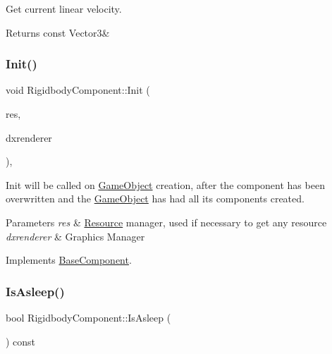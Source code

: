 Get current linear velocity. 

\begin{DoxyReturn}{Returns}
const Vector3\& 
\end{DoxyReturn}
\mbox{\label{classRigidbodyComponent_a3fe46e628d20481031089e0e3e6bc6ee}} 
\subsubsection{\texorpdfstring{Init()}{Init()}}
{\footnotesize\ttfamily void Rigidbody\+Component\+::\+Init (\begin{DoxyParamCaption}\item[{\hyperlink{classResourceManager}{Resource\+Manager} $\ast$}]{res,  }\item[{\hyperlink{classDXRenderer}{D\+X\+Renderer} $\ast$}]{dxrenderer }\end{DoxyParamCaption})\hspace{0.3cm}{\ttfamily [override]}, {\ttfamily [virtual]}}



Init will be called on \hyperlink{classGameObject}{Game\+Object} creation, after the component has been overwritten and the \hyperlink{classGameObject}{Game\+Object} has had all its components created. 


\begin{DoxyParams}{Parameters}
{\em res} & \hyperlink{structResource}{Resource} manager, used if necessary to get any resource \\
\hline
{\em dxrenderer} & Graphic\textquotesingle{}s Manager \\
\hline
\end{DoxyParams}


Implements \hyperlink{classBaseComponent}{Base\+Component}.

\mbox{\label{classRigidbodyComponent_a5ea94f888c37f71c6e7206b0497f1bc8}} 
\subsubsection{\texorpdfstring{Is\+Asleep()}{IsAsleep()}}
{\footnotesize\ttfamily bool Rigidbody\+Component\+::\+Is\+Asleep (\begin{DoxyParamCaption}{ }\end{DoxyParamCaption}) const}



